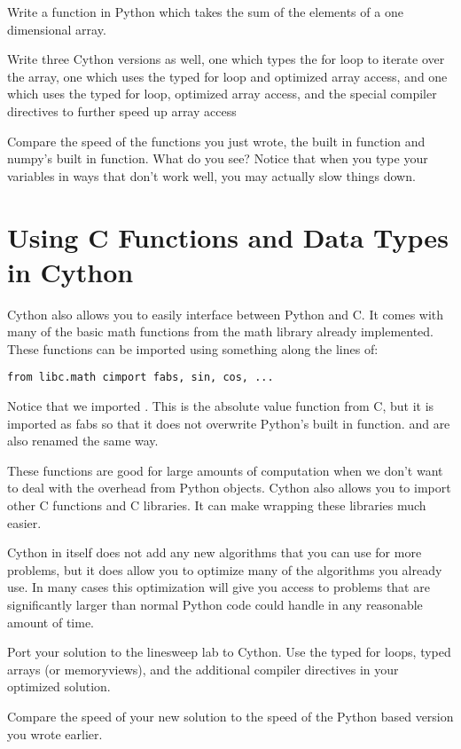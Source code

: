 \begin{problem}

Write a function in Python which takes the sum of the elements of a one dimensional array.

Write three Cython versions as well, one which types the for loop to iterate over the array, one which uses the typed for loop and optimized array access, and one which uses the typed for loop, optimized array access, and the special compiler directives to further speed up array access

Compare the speed of the functions you just wrote, the built in  function and numpy's built in  function.
What do you see?
Notice that when you type your variables in ways that don't work well, you may actually slow things down.

\end{problem}

\section*{Using C Functions and Data Types in Cython}

Cython also allows you to easily interface between Python and C.
It comes with many of the basic math functions from the math library already implemented.
These functions can be imported using something along the lines of:
\begin{lstlisting}
from libc.math cimport fabs, sin, cos, ...
\end{lstlisting}

Notice that we imported .
This is the absolute value function from C, but it is imported as fabs so that it does not overwrite Python's built in  function. 
 and  are also renamed the same way.

These functions are good for large amounts of computation when we don't want to deal with the overhead from Python objects.
Cython also allows you to import other C functions and C libraries.
It can make wrapping these libraries much easier.

Cython in itself does not add any new algorithms that you can use for more problems, but it does allow you to optimize many of the algorithms you already use.
In many cases this optimization will give you access to problems that are significantly larger than normal Python code could handle in any reasonable amount of time.

\begin{problem}
Port your solution to the linesweep lab to Cython.
Use the typed for loops, typed arrays (or memoryviews), and the additional compiler directives in your optimized solution.

Compare the speed of your new solution to the speed of the Python based version you wrote earlier.
\end{problem}


